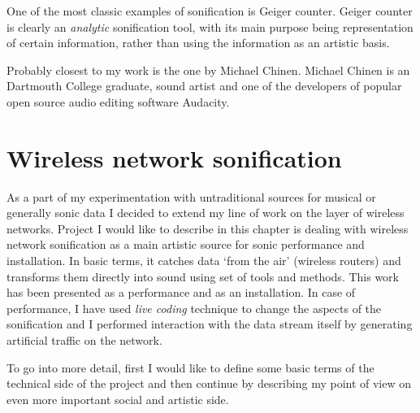 \documentclass[11pt,a4paper,oneside]{report}
\begin{document}
One of the most classic examples of sonification is Geiger counter. Geiger counter is clearly an \textit{analytic} sonification tool, with its main purpose being representation of certain information, rather than using the information as an artistic basis.

Probably closest to my work is the one by Michael Chinen. Michael Chinen is an Dartmouth College graduate, sound artist and one of the developers of popular open source audio editing software Audacity.



\section{Wireless network sonification}

As a part of my experimentation with untraditional sources for musical or generally sonic data I decided to extend my line of work on the layer of wireless networks. Project I would like to describe in this chapter is dealing with wireless network sonification as a main artistic source for sonic performance and installation. In basic terms, it catches data `from the air' (wireless routers) and transforms them directly into sound using set of tools and methods. This work has been presented as a performance and as an installation. In case of performance, I have used \textit{live coding} technique to change the aspects of the sonification and I performed interaction with the data stream itself by generating artificial traffic on the network.

To go into more detail, first I would like to define some basic terms of the technical side of the project and then continue by describing my point of view on even more important social and artistic side.

\end{document}
